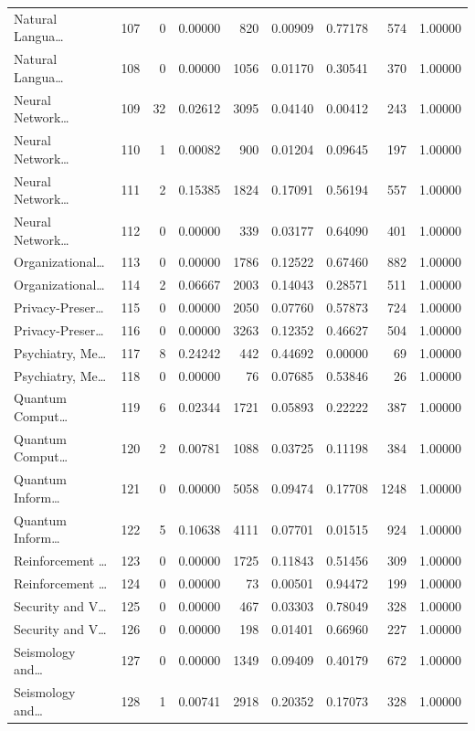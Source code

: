 \begin{table}
\begin{tabular}{lrrrrrrrr}
Natural Langua… & 107 & 0 & 0.00000 & 820 & 0.00909 & 0.77178 & 574 & 1.00000 \\
Natural Langua… & 108 & 0 & 0.00000 & 1056 & 0.01170 & 0.30541 & 370 & 1.00000 \\
Neural Network… & 109 & 32 & 0.02612 & 3095 & 0.04140 & 0.00412 & 243 & 1.00000 \\
Neural Network… & 110 & 1 & 0.00082 & 900 & 0.01204 & 0.09645 & 197 & 1.00000 \\
Neural Network… & 111 & 2 & 0.15385 & 1824 & 0.17091 & 0.56194 & 557 & 1.00000 \\
Neural Network… & 112 & 0 & 0.00000 & 339 & 0.03177 & 0.64090 & 401 & 1.00000 \\
Organizational… & 113 & 0 & 0.00000 & 1786 & 0.12522 & 0.67460 & 882 & 1.00000 \\
Organizational… & 114 & 2 & 0.06667 & 2003 & 0.14043 & 0.28571 & 511 & 1.00000 \\
Privacy-Preser… & 115 & 0 & 0.00000 & 2050 & 0.07760 & 0.57873 & 724 & 1.00000 \\
Privacy-Preser… & 116 & 0 & 0.00000 & 3263 & 0.12352 & 0.46627 & 504 & 1.00000 \\
Psychiatry, Me… & 117 & 8 & 0.24242 & 442 & 0.44692 & 0.00000 & 69 & 1.00000 \\
Psychiatry, Me… & 118 & 0 & 0.00000 & 76 & 0.07685 & 0.53846 & 26 & 1.00000 \\
Quantum Comput… & 119 & 6 & 0.02344 & 1721 & 0.05893 & 0.22222 & 387 & 1.00000 \\
Quantum Comput… & 120 & 2 & 0.00781 & 1088 & 0.03725 & 0.11198 & 384 & 1.00000 \\
Quantum Inform… & 121 & 0 & 0.00000 & 5058 & 0.09474 & 0.17708 & 1248 & 1.00000 \\
Quantum Inform… & 122 & 5 & 0.10638 & 4111 & 0.07701 & 0.01515 & 924 & 1.00000 \\
Reinforcement … & 123 & 0 & 0.00000 & 1725 & 0.11843 & 0.51456 & 309 & 1.00000 \\
Reinforcement … & 124 & 0 & 0.00000 & 73 & 0.00501 & 0.94472 & 199 & 1.00000 \\
Security and V… & 125 & 0 & 0.00000 & 467 & 0.03303 & 0.78049 & 328 & 1.00000 \\
Security and V… & 126 & 0 & 0.00000 & 198 & 0.01401 & 0.66960 & 227 & 1.00000 \\
Seismology and… & 127 & 0 & 0.00000 & 1349 & 0.09409 & 0.40179 & 672 & 1.00000 \\
Seismology and… & 128 & 1 & 0.00741 & 2918 & 0.20352 & 0.17073 & 328 & 1.00000 \\

\end{tabular}
\end{table}
